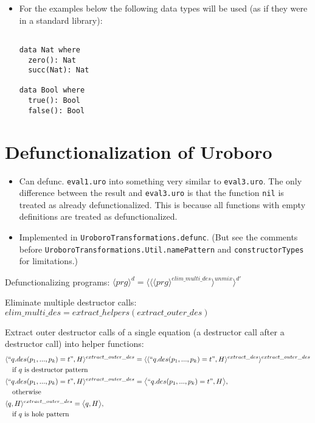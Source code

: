 \documentclass[11pt]{article} %
\begin{document}
\begin{itemize}
\item For the examples below the following data types will be used (as if they were in a standard library):
\begin{lstlisting}

data Nat where
  zero(): Nat
  succ(Nat): Nat

data Bool where
  true(): Bool
  false(): Bool

\end{lstlisting}

\end{itemize}

\section{Defunctionalization of Uroboro}

\begin{itemize}
\item Can defunc. \texttt{eval1.uro} into something very similar to \texttt{eval3.uro}. The only difference between the result and \texttt{eval3.uro} is that the function \texttt{nil} is treated as already defunctionalized. This is because all functions with empty definitions are treated as defunctionalized.

\item Implemented in \texttt{UroboroTransformations.defunc}. (But see the comments before \texttt{UroboroTransformations.Util.namePattern} and \texttt{constructorTypes} for limitations.)

\end{itemize}

Defunctionalizing programs: $\langle prg \rangle^d = \langle \langle \langle prg \rangle^{elim\_multi\_des} \rangle^{unmix} \rangle^{d'}$

Eliminate multiple destructor calls: $elim\_multi\_des = extract\_helpers(extract\_outer\_des)$

Extract outer destructor calls of a single equation (a destructor call after a destructor call) into helper functions:
\begin{alignat*}{2}
& \langle `` q.des(p_1, ..., p_k) = t ", H \rangle^{extract\_outer\_des} = \langle \langle `` q.des(p_1, ..., p_k) = t ", H \rangle^{extract\_des} \rangle^{extract\_outer\_des} \\
&\quad \textrm{if $q$ is destructor pattern } \\
& \langle `` q.des(p_1, ..., p_k) = t ", H \rangle^{extract\_outer\_des} = \big\langle `` q.des(p_1, ..., p_k) = t ", H \big\rangle, \\
&\quad \textrm{otherwise} \\
& \langle q, H \rangle^{extract\_outer\_des} = \big\langle q, H \big\rangle, \\
&\quad \textrm{if $q$ is hole pattern}
\end{alignat*}
\end{document}
